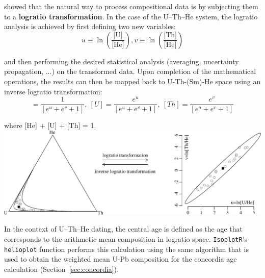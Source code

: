 \begin{refsection}
\citet{aitchison1986} showed that the natural way to process
compositional data is by subjecting them to a \textbf{logratio
  transformation}. In the case of the U--Th--He system, the logratio
analysis is achieved by first defining two new variables:
\begin{equation}
  u \equiv \ln\!\left(\frac{\mbox{[U]}}{\mbox{[He]}}\right),
  v \equiv \ln\!\left(\frac{\mbox{[Th]}}{\mbox{[He]}}\right)
  \label{eq:alr}
\end{equation}

\noindent and then performing the desired statistical analysis
(averaging, uncertainty propagation, ...) on the transformed
data. Upon completion of the mathematical operations, the results can
then be mapped back to U-Th-(Sm)-He space using an inverse logratio
transformation:
\begin{equation}
    [He] = \frac{1}{\left[e^{u}+e^{v}+1\right]},~
    [U] = \frac{e^{u}}{\left[e^{u}+e^{v}+1\right]},~
    [Th] = \frac{e^{v}}{\left[e^{u}+e^{v}+1\right]}
    \label{eq:ialr}
\end{equation}

\noindent where [He] + [U] + [Th] = 1.\\

\noindent\includegraphics[width=\linewidth]{../figures/alr.pdf}
\begingroup
{}
\label{fig:alr}
\endgroup

In the context of U--Th--He dating, the central age is defined as the
age that corresponds to the arithmetic mean composition in logratio
space. \texttt{IsoplotR}'s \texttt{helioplot} function performs this
calculation using the same algorithm that is used to obtain the
weighted mean U-Pb composition for the concordia age calculation
(Section~\ref{sec:concordia}).\\


\end{refsection}

